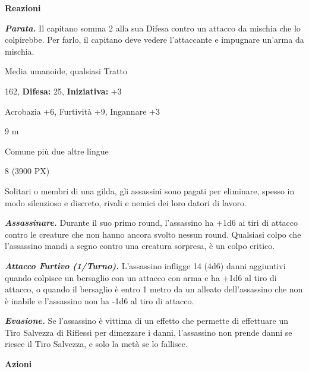 \begin{multicols}{2}
{\textbf{Reazioni}

\emph{\textbf{Parata.}} Il capitano somma 2 alla sua Difesa contro un attacco da mischia che lo colpirebbe. Per farlo, il capitano deve vedere l'attaccante e impugnare un'arma da mischia.

\begin{description}[noitemsep, topsep=0pt, parsep=0pt, partopsep=0pt, leftmargin=0cm, labelwidth=2.2cm]
    \item[\textbf{Taglia/Tipo:}] Media umanoide, qualsiasi Tratto
    \item[\textbf{Caratt.:}] 
    \item[\textbf{Punti Ferita:}] 162,  \textbf{Difesa:} 25,  \textbf{Iniziativa:} +3
    \item[\textbf{Comp.:}] Acrobazia +6, Furtività +9, Ingannare +3
    \item[\textbf{Tiri Salvez.:}] 
    \item[\textbf{Movimento:}] 9 m
    \item[\textbf{Linguaggi:}] Comune più due altre lingue
    \item[\textbf{Sfida:}] 8 (3900 PX)\smallskip
\end{description}

Solitari o membri di una gilda, gli assassini sono pagati per eliminare, spesso in modo silenzioso e discreto, rivali e nemici dei loro datori di lavoro.

\emph{\textbf{Assassinare.}} Durante il suo primo round, l'assassino ha +1d6 ai tiri di attacco contro le creature che non hanno ancora svolto nessun round. Qualsiasi colpo che l'assassino mandi a segno contro una creatura sorpresa, è un colpo critico.

\emph{\textbf{Attacco Furtivo (1/Turno).}} L'assassino infligge 14 (4d6) danni aggiuntivi quando colpisce un bersaglio con un attacco con arma e ha +1d6 al tiro di attacco, o quando il bersaglio è entro 1 metro da un alleato dell'assassino che non è inabile e l'assassino non ha -1d6 al tiro di attacco.

\emph{\textbf{Evasione.}} Se l'assassino è vittima di un effetto che permette di effettuare un Tiro Salvezza di Riflessi per dimezzare i danni, l'assassino non prende danni se riesce il Tiro Salvezza, e solo la metà se lo fallisce.

\textbf{Azioni}

}
\end{multicols}
